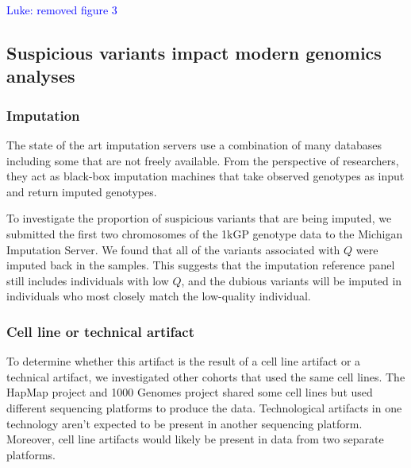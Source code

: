 \documentclass[9pt,lineno]{elife}
\newcommand{\luke}[1]{\textcolor{blue}{Luke: #1}}
\begin{document}
\luke{removed figure 3}


\subsection{Suspicious variants impact modern genomics analyses}
\subsubsection{Imputation}
The state of the art imputation servers use a combination of many databases including some that are not freely available.
From the perspective of researchers, they act as black-box imputation machines that take observed genotypes as input and return imputed genotypes.  

To investigate the proportion of suspicious variants that are being imputed, we submitted the first two chromosomes of  the 1kGP genotype data to the Michigan Imputation Server.
We found that all of the variants associated with $Q$ were imputed back in the samples.
This suggests that the imputation reference panel still includes individuals with low $Q$, and the dubious variants will be imputed in individuals who most closely match the low-quality individual.

\subsubsection{Cell line or technical artifact}

To determine whether this artifact is the result of a cell line artifact or a technical artifact, we investigated other cohorts that used the same cell lines.
The HapMap project and 1000 Genomes project shared some cell lines but used different sequencing platforms to produce the data.
Technological artifacts in one technology aren't expected to be present in another sequencing platform.
Moreover, cell line artifacts would likely be present in data from two separate platforms.
\end{document}
